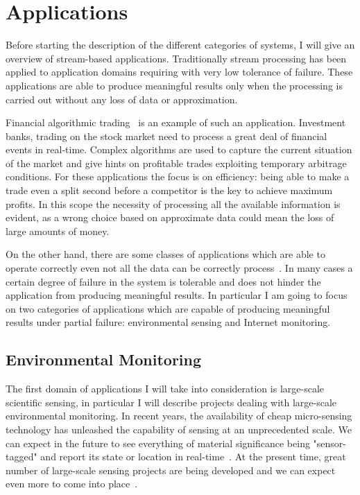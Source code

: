 \section{Applications}
\label{sec:apps}

Before starting the description of the different categories of systems, I will give an overview of stream-based
applications. Traditionally stream processing has been applied to application domains requiring with very low tolerance
of failure. These applications are able to produce meaningful results only when the processing is carried out without
any loss of data or approximation.

Financial algorithmic trading~\cite{streambase-algo} is an example of such an application. Investment banks, trading on the stock market need
to process a great deal of financial events in real-time. Complex algorithms are used to capture the current situation
of the market and give hints on profitable trades exploiting temporary arbitrage conditions. For these applications the
focus is on efficiency: being able to make a trade even a split second before a competitor is the key to achieve maximum
profits. In this scope the necessity of processing all the available information is evident, as a wrong choice based on
approximate data could mean the loss of large amounts of money.

On the other hand, there are some classes of applications which are able to operate correctly even not all the data can
be correctly process~\cite{phi}. In many cases a certain degree of failure in the system is tolerable and does not hinder the application from producing
meaningful results. In particular I am going to focus on two categories of applications which are capable of producing meaningful
results under partial failure: environmental sensing and Internet monitoring. 

\subsection{Environmental Monitoring}
\label{envmon}

The first domain of applications I will take into consideration is large-scale scientific sensing, in
particular I will describe projects dealing with large-scale environmental monitoring.  In recent years,
the availability of cheap micro-sensing technology has unleashed the capability of sensing at an
unprecedented scale. We can expect in the future to see everything of material significance being
"sensor-tagged" and report its state or location in
real-time~\cite{irisnet,qpsn,stream-processing-challanges}. At the present time, great number of
large-scale sensing projects are being developed and we can expect even more to come into
place~\cite{earthscope,neon,casa-lead,swissexp}.

